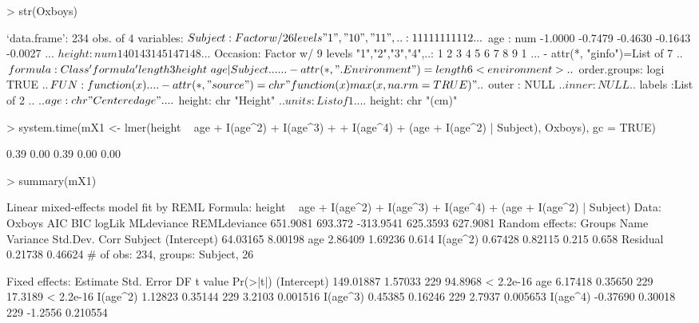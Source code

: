 \documentclass[12pt]{article}
\begin{document}
\begin{Schunk}
\begin{Sinput}
> str(Oxboys)
\end{Sinput}
\begin{Soutput}
`data.frame':	234 obs. of  4 variables:
 $ Subject : Factor w/ 26 levels "1","10","11",..: 1 1 1 1 1 1 1 1 1 12 ...
 $ age     : num  -1.0000 -0.7479 -0.4630 -0.1643 -0.0027 ...
 $ height  : num  140 143 145 147 148 ...
 $ Occasion: Factor w/ 9 levels "1","2","3","4",..: 1 2 3 4 5 6 7 8 9 1 ...
 - attr(*, "ginfo")=List of 7
  ..$ formula     :Class 'formula' length 3 height ~ age | Subject
  .. .. ..- attr(*, ".Environment")=length 6 <environment> 
  ..$ order.groups: logi TRUE
  ..$ FUN         :function (x)  
  .. ..- attr(*, "source")= chr "function (x) max(x, na.rm = TRUE)"
  ..$ outer       : NULL
  ..$ inner       : NULL
  ..$ labels      :List of 2
  .. ..$ age   : chr "Centered age"
  .. ..$ height: chr "Height"
  ..$ units       :List of 1
  .. ..$ height: chr "(cm)"
\end{Soutput}
\begin{Sinput}
> system.time(mX1 <- lmer(height ~ age + I(age^2) + I(age^3) + 
+     I(age^4) + (age + I(age^2) | Subject), Oxboys), gc = TRUE)
\end{Sinput}
\begin{Soutput}
[1] 0.39 0.00 0.39 0.00 0.00
\end{Soutput}
\begin{Sinput}
> summary(mX1)
\end{Sinput}
\begin{Soutput}
Linear mixed-effects model fit by REML
Formula: height ~ age + I(age^2) + I(age^3) + I(age^4) + (age + I(age^2) |      Subject) 
   Data: Oxboys 
      AIC     BIC    logLik MLdeviance REMLdeviance
 651.9081 693.372 -313.9541   625.3593     627.9081
Random effects:
 Groups   Name        Variance Std.Dev. Corr        
 Subject  (Intercept) 64.03165 8.00198              
          age          2.86409 1.69236  0.614       
          I(age^2)     0.67428 0.82115  0.215 0.658 
 Residual              0.21738 0.46624              
# of obs: 234, groups: Subject, 26

Fixed effects:
             Estimate Std. Error  DF t value  Pr(>|t|)
(Intercept) 149.01887    1.57033 229 94.8968 < 2.2e-16
age           6.17418    0.35650 229 17.3189 < 2.2e-16
I(age^2)      1.12823    0.35144 229  3.2103  0.001516
I(age^3)      0.45385    0.16246 229  2.7937  0.005653
I(age^4)     -0.37690    0.30018 229 -1.2556  0.210554


\end{Soutput}
\end{Schunk}
\end{document}
